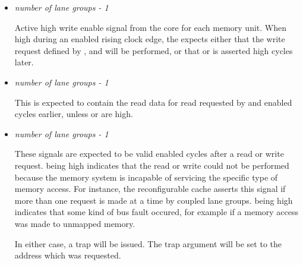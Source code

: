 \begin{itemize}
\vspace{1em}
\item {}\textit{number of lane groups - 1}

Active high write enable signal from the core for each memory unit. When high 
during an enabled rising clock edge, the \rvex{} expects either that the write 
request defined by ,  and 
 will be performed, or that  or 
 is asserted high  cycles later.

\vspace{1em}
\item {}\textit{number of lane groups - 1}

This is expected to contain the read data for read requested by 
 and   enabled cycles 
earlier, unless  or  are high.

\vspace{1em}
\item {}\textit{number of lane groups - 1}

These signals are expected to be valid  enabled cycles after a read 
or write request.  being high indicates that the read 
or write could not be performed because the memory system is incapable of 
servicing the specific type of memory access. For instance, the reconfigurable 
cache asserts this signal if more than one request is made at a time by coupled 
lane groups.  being high indicates that some kind of bus 
fault occured, for example if a memory access was made to unmapped memory.

In either case, a  trap will be issued. The trap argument will 
be set to the address which was requested.


\end{itemize}

